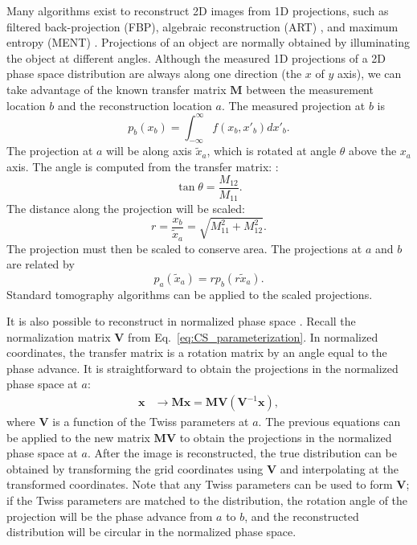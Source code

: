 Many algorithms exist to reconstruct 2D images from 1D projections, such as filtered back-projection (FBP), algebraic reconstruction (ART) \cite{Slaney1988}, and maximum entropy (MENT) \cite{Minerbo1979}. Projections of an object are normally obtained by illuminating the object at different angles. Although the measured 1D projections of a 2D phase space distribution are always along one direction (the $x$ of $y$ axis), we can take advantage of the known transfer matrix $\mathbf{M}$ between the measurement location $b$ and the reconstruction location $a$. The measured projection at $b$ is
%
\begin{equation}
    p_b(x_b) = \int_{-\infty}^{\infty} f(x_b, x'_b) dx'_b.
\end{equation}
%
The projection at $a$ will be along axis $\tilde{x}_a$, which is rotated at angle $\theta$ above the $x_a$ axis. The angle is computed from the transfer matrix: \cite{Hock2013a}: 
%
\begin{equation}\label{eq:proj_trans_1}
    \tan\theta = \frac{M_{12}}{M_{11}}.
\end{equation}
%
The distance along the projection will be scaled:
%
\begin{equation}\label{eq:proj_trans_2}
    r = \frac{x_b}{\tilde{x}_a} = \sqrt{M_{11}^2 + M_{12}^2}.
\end{equation}
%
The projection must then be scaled to conserve area. The projections at $a$ and $b$ are related by 
%
\begin{equation}\label{eq:proj_trans_3}
    p_a(\tilde{x}_a) = r p_b(r \tilde{x}_a).
\end{equation}
%
Standard tomography algorithms can be applied to the scaled projections.

It is also possible to reconstruct in normalized phase space \cite{Hock2011}. Recall the normalization matrix $\mathbf{V}$ from Eq.~\eqref{eq:CS_parameterization}. In normalized coordinates, the transfer matrix is a rotation matrix by an angle equal to the phase advance. It is straightforward to obtain the projections in the normalized phase space at $a$:
%
\begin{equation}
\begin{aligned}
    \mathbf{x} &\rightarrow \mathbf{M} \mathbf{x}
    = \mathbf{M} \mathbf{V} (\mathbf{V}^{-1} \mathbf{x})
    ,
\end{aligned}
\end{equation}
%
where $\mathbf{V}$ is a function of the Twiss parameters at $a$. The previous equations can be applied to the new matrix $\mathbf{M} \mathbf{V}$ to obtain the projections in the normalized phase space at $a$. After the image is reconstructed, the true distribution can be obtained by transforming the grid coordinates using $\mathbf{V}$ and interpolating at the transformed coordinates. Note that any Twiss parameters can be used to form $\mathbf{V}$; if the Twiss parameters are matched to the distribution, the rotation angle of the projection will be the phase advance from $a$ to $b$, and the reconstructed distribution will be circular in the normalized phase space.


